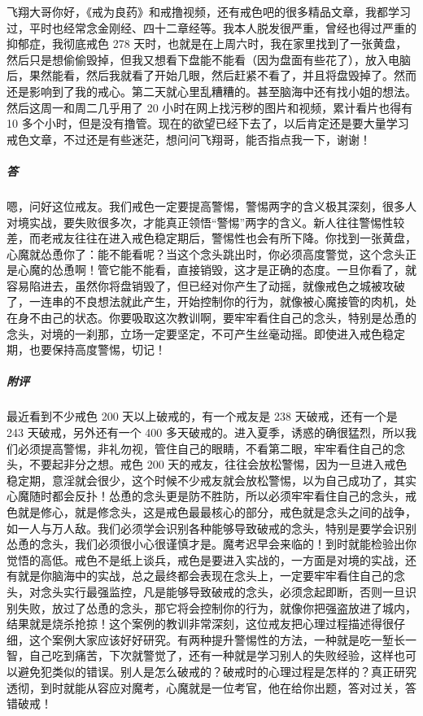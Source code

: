 \begin{case}
    飞翔大哥你好，《戒为良药》和戒撸视频，还有戒色吧的很多精品文章，我都学习过，平时也经常念金刚经、四十二章经等。我本人脱发很严重，曾经也得过严重的抑郁症，我彻底戒色 278 天时，也就是在上周六时，我在家里找到了一张黄盘，然后只是想偷偷毁掉，但我又想看下盘能不能看（因为盘面有些花了），放入电脑后，果然能看，然后我就看了开始几眼，然后赶紧不看了，并且将盘毁掉了。然而还是影响到了我的戒心。第二天就心里乱糟糟的。甚至脑海中还有找小姐的想法。然后这周一和周二几乎用了 20 小时在网上找污秽的图片和视频，累计看片也得有 10 多个小时，但是没有撸管。现在的欲望已经下去了，以后肯定还是要大量学习戒色文章，不过还是有些迷茫，想问问飞翔哥，能否指点我一下，谢谢！
    \subparagraph{答} 嗯，问好这位戒友。我们戒色一定要提高警惕，警惕两字的含义极其深刻，很多人对境实战，要失败很多次，才能真正领悟“警惕”两字的含义。新人往往警惕性较差，而老戒友往往在进入戒色稳定期后，警惕性也会有所下降。你找到一张黄盘，心魔就怂恿你了：能不能看呢？当这个念头跳出时，你必须高度警觉，这个念头正是心魔的怂恿啊！管它能不能看，直接销毁，这才是正确的态度。一旦你看了，就容易陷进去，虽然你将盘销毁了，但已经对你产生了动摇，就像戒色之城被攻破了，一连串的不良想法就此产生，开始控制你的行为，就像被心魔接管的肉机，处在身不由己的状态。你要吸取这次教训啊，要牢牢看住自己的念头，特别是怂恿的念头，对境的一刹那，立场一定要坚定，不可产生丝毫动摇。即使进入戒色稳定期，也要保持高度警惕，切记！
    \subparagraph{附评} 最近看到不少戒色 200 天以上破戒的，有一个戒友是 238 天破戒，还有一个是 243 天破戒，另外还有一个 400 多天破戒的。进入夏季，诱惑的确很猛烈，所以我们必须提高警惕，非礼勿视，管住自己的眼睛，不看第二眼，牢牢看住自己的念头，不要起非分之想。戒色 200 天的戒友，往往会放松警惕，因为一旦进入戒色稳定期，意淫就会很少，这个时候不少戒友就会放松警惕，以为自己成功了，其实心魔随时都会反扑！怂恿的念头更是防不胜防，所以必须牢牢看住自己的念头，戒色就是修心，就是修念头，这是戒色最最核心的部分，戒色就是念头之间的战争，如一人与万人敌。我们必须学会识别各种能够导致破戒的念头，特别是要学会识别怂恿的念头，我们必须很小心很谨慎才是。魔考迟早会来临的！到时就能检验出你觉悟的高低。戒色不是纸上谈兵，戒色是要进入实战的，一方面是对境的实战，还有就是你脑海中的实战，总之最终都会表现在念头上，一定要牢牢看住自己的念头，对念头实行最强监控，凡是能够导致破戒的念头，必须念起即断，否则一旦识别失败，放过了怂恿的念头，那它将会控制你的行为，就像你把强盗放进了城内，结果就是烧杀抢掠！这个案例的教训非常深刻，这位戒友把心理过程描述得很仔细，这个案例大家应该好好研究。有两种提升警惕性的方法，一种就是吃一堑长一智，自己吃到痛苦，下次就警觉了，还有一种就是学习别人的失败经验，这样也可以避免犯类似的错误。别人是怎么破戒的？破戒时的心理过程是怎样的？真正研究透彻，到时就能从容应对魔考，心魔就是一位考官，他在给你出题，答对过关，答错破戒！
\end{case}

